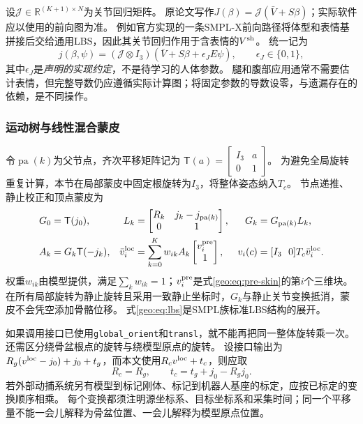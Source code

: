 \documentclass[11pt,a4paper]{article}
\numberwithin{equation}{section}
\theoremstyle{definition}
\newcommand{\R}{\mathbb R}
\begin{document}
设$\mathcal J\in\R^{(K+1)\times N}$为关节回归矩阵。
原论文写作$J(\beta)=\mathcal J(\bar V+S\beta)$；实际软件应以使用的前向图为准。
例如官方实现的一条SMPL-X前向路径将体型和表情基拼接后交给通用LBS，因此其关节回归作用于含表情的$V^{\rm sh}$\cite{geoSMPLXCode}。
统一记为
\begin{equation}
 j(\beta,\psi)=(\mathcal J\otimes I_3)
          (\bar V+S\beta+\epsilon_J E\psi),
 \qquad \epsilon_J\in\{0,1\},
 \label{geo:eq:joint-regression}
\end{equation}
其中$\epsilon_J$是\emph{声明的实现约定}，不是待学习的人体参数。
腿和腹部应用通常不需要估计表情，但完整导数仍应遵循实际计算图；将固定参数的导数设零，与遗漏存在的依赖，是不同操作。

\subsubsection{运动树与线性混合蒙皮}
令$\operatorname{pa}(k)$为父节点，齐次平移矩阵记为
$\mathsf T(a)=\left[\begin{smallmatrix}I_3&a\\0&1\end{smallmatrix}\right]$。
为避免全局旋转重复计算，本节在局部蒙皮中固定根旋转为$I_3$，将整体姿态纳入$T_c$。
节点递推、静止校正和顶点蒙皮为
\begin{align}
 G_0&=\mathsf T(j_0),&
 L_k&=\begin{bmatrix}R_k&j_k-j_{\operatorname{pa}(k)}\\0&1\end{bmatrix},
 &G_k&=G_{\operatorname{pa}(k)}L_k,\\
 A_k&=G_k\mathsf T(-j_k),&
 \bar v_i^{\rm loc}&=\sum_{k=0}^{K}w_{ik} A_k
             \begin{bmatrix}v_i^{\rm pre}\\1\end{bmatrix},
 &v_i(c)&=[I_3\ \ 0]T_c\bar v_i^{\rm loc}.
 \label{geo:eq:lbs}
\end{align}
权重$w_{ik}$由模型提供，满足$\sum_k w_{ik}=1$；$v_i^{\rm pre}$是式\eqref{geo:eq:pre-skin}的第$i$个三维块。
在所有局部旋转为静止旋转且采用一致静止坐标时，$G_k$与静止关节变换抵消，蒙皮不会凭空添加骨骼位移。
式\eqref{geo:eq:lbs}是SMPL族标准LBS结构的展开\cite{geoLoper2015}。

如果调用接口已使用\texttt{global\_orient}和\texttt{transl}，就不能再把同一整体旋转乘一次。
还需区分绕骨盆根点的旋转与绕模型原点的旋转。
设接口输出为$R_g(v^{\rm loc}-j_0)+j_0+t_g$，而本文使用$R_cv^{\rm loc}+t_c$，则应取
\begin{equation}
 R_c=R_g,\qquad t_c=t_g+j_0-R_gj_0.
 \label{geo:eq:root-conversion}
\end{equation}
若外部动捕系统另有模型到标记刚体、标记到机器人基座的标定，应按已标定的变换顺序相乘。
每个变换都须注明源坐标系、目标坐标系和采集时间；同一个平移量不能一会儿解释为骨盆位置、一会儿解释为模型原点位置。
\end{document}
